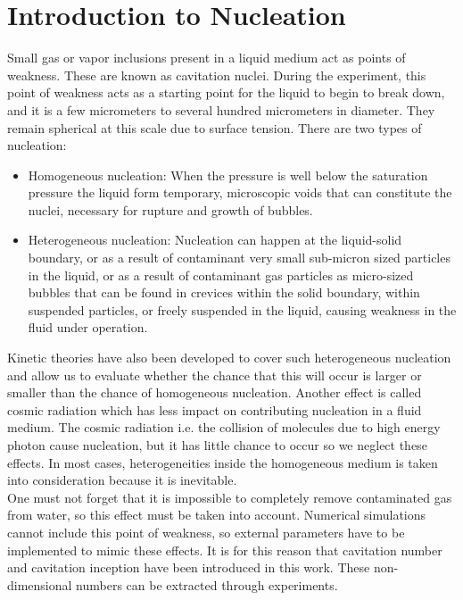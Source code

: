 \section{Introduction to Nucleation}
Small gas or vapor inclusions present in a liquid medium act as points of weakness. 
These are known as cavitation nuclei. During the experiment, this point of weakness 
acts as a starting point for the liquid to begin to break down, and it is a few micrometers 
to several hundred micrometers in diameter. They remain spherical at this scale due to 
surface tension. There are two types of nucleation:

\begin{itemize}
\item Homogeneous nucleation: When the pressure is well below the
  saturation pressure the liquid form temporary, microscopic voids
  that can constitute the nuclei, necessary for rupture and growth of
  bubbles.
\item Heterogeneous nucleation: Nucleation can happen at the liquid-solid boundary, 
or as a result of contaminant very small sub-micron sized particles in the liquid, 
or as a result of contaminant gas particles as micro-sized bubbles that can be 
found in crevices within the solid boundary, within suspended particles, 
or freely suspended in the liquid, causing weakness in the fluid under operation. 
\end{itemize}

Kinetic theories have also been developed to cover such heterogeneous
nucleation and allow us to evaluate whether the chance that this will
occur is larger or smaller than the chance of homogeneous nucleation.
Another effect is called cosmic radiation which has less impact on contributing nucleation in a fluid medium. The cosmic
radiation i.e. the collision of molecules due to high energy photon
cause nucleation, but it has little chance to occur so we neglect
these effects. In most cases, heterogeneities inside
the homogeneous medium is taken into consideration because it is
inevitable.\\ One must not forget that it is impossible to completely remove  contaminated gas from water, 
so this effect must be taken into account. Numerical simulations cannot include this point 
of weakness, so external parameters have to be implemented to mimic these effects. 
It is for this reason that cavitation number and cavitation inception have been introduced 
in this work. These non-dimensional numbers can be extracted through experiments.\\

